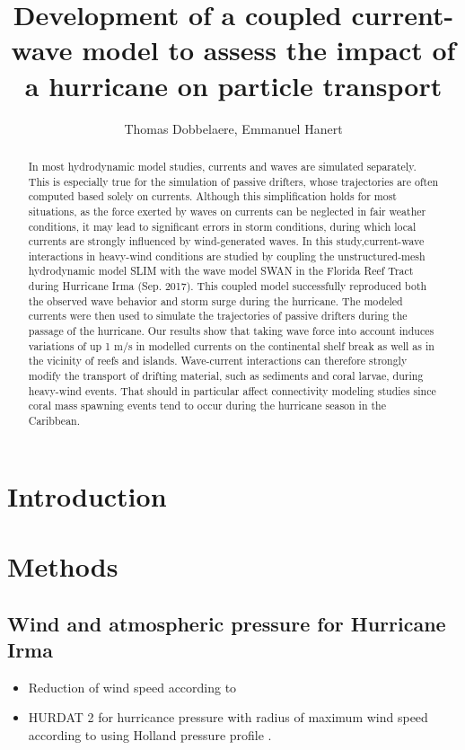 \documentclass[11pt,a4paper]{article}
\title{Development of a coupled current-wave model to assess the impact of a hurricane on particle transport}
\author{Thomas Dobbelaere, Emmanuel Hanert}
\begin{document}
\maketitle
\begin{abstract}
In most hydrodynamic model studies, currents and waves are simulated separately. This is especially true for the simulation of passive drifters, whose trajectories are often computed based solely on currents. Although this simplification holds for most situations, as the force exerted by waves on currents can be neglected in fair weather conditions, it may lead to significant errors in storm conditions, during which local currents are strongly influenced by wind-generated waves. In this study,current-wave interactions in heavy-wind conditions  are studied by coupling the unstructured-mesh hydrodynamic model SLIM with the wave model SWAN in the Florida Reef Tract during Hurricane Irma (Sep. 2017). This coupled model successfully reproduced both the observed wave behavior and storm surge during the hurricane. The modeled currents were then used to simulate the trajectories of passive drifters during the passage of the hurricane. Our results show that taking wave force into account induces  variations of up 1 m/s in modelled currents on the continental shelf break as well as in the vicinity of  reefs and islands. Wave-current interactions can therefore strongly modify  the transport of drifting material, such as sediments and coral larvae, during heavy-wind events. That should in particular affect connectivity modeling studies since coral mass spawning events tend to occur during the hurricane season in the Caribbean.

\end{abstract}

\section{Introduction}


\section{Methods}
\subsection{Wind and atmospheric pressure for Hurricane Irma}
\begin{itemize}
    \item Reduction of wind speed according to \cite{harper2010guidelines}
    \item HURDAT 2 \citep{landsea2013atlantic} for hurricance pressure with radius of maximum wind speed according to \cite{knaff2018statistical} using Holland pressure profile \citep{lin2012hurricane}.
\end{itemize}
\end{document}
